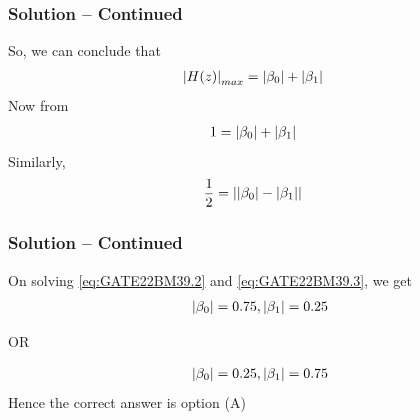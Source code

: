\documentclass{beamer}
\begin{document}
\begin{frame}
\frametitle{Solution -- Continued}
So, we can conclude that
\begin{align}
\left\vert H(z)\right\vert_{max} &= \left\vert\beta_0\right\vert + \left\vert\beta_1\right\vert 
\end{align}
Now from 
\begin{align}
1 &= \left\vert\beta_0\right\vert + \left\vert\beta_1\right\vert \label {eq:GATE22BM39.2}
\end{align}
Similarly,
\begin{align}
\frac{1}{2} &= \left\vert\left\vert\beta_0\right\vert-\left\vert\beta_1\right\vert\right\vert \label {eq:GATE22BM39.3}
\end{align}
\end{frame}

\begin{frame}
\frametitle{Solution -- Continued}
On solving \eqref{eq:GATE22BM39.2} and \eqref{eq:GATE22BM39.3}, we get
\begin{align}
\left\vert\beta_0\right\vert = 0.75, \left\vert\beta_1\right\vert = 0.25 
\end{align}
\begin{center}
OR
\end{center}
\begin{align}
\left\vert\beta_0\right\vert = 0.25, \left\vert\beta_1\right\vert = 0.75 
\end{align}
Hence the correct answer is option (A) \\
\end{frame}
\end{document}
